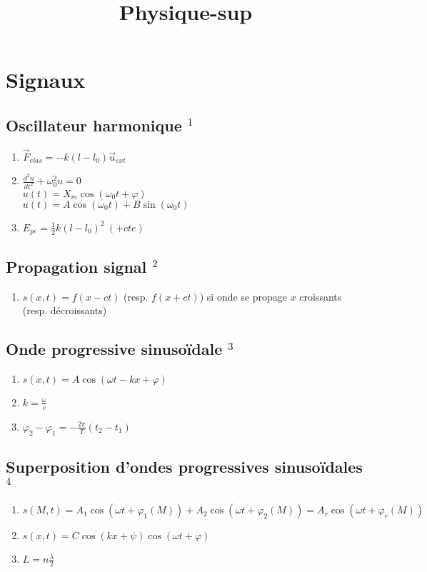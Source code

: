 \documentclass[fleqn]{article}
\title{Physique-sup}
\date{}
\theoremstyle{definition} \newtheorem*{defi}{D\'efinition}
\theoremstyle{definition} \newtheorem*{theo}{Th\'eor\`eme}
\theoremstyle{definition} \newtheorem*{coro}{Corollaire}
\theoremstyle{remark} \newtheorem*{rqs}{Remarques}
\theoremstyle{definition} \newtheorem*{prop}{Propri\'et\'e}
\begin{document}
\maketitle
\tableofcontents

\newpage
\section{Signaux}
\subsection{Oscillateur harmonique $^1$}
\begin{enumerate}
	\item $\vec{F}_{elas} = -k(l - l_0)\vec{u}_{ext}$
	\item $\frac{d^2u}{dt^2} + \omega_0^2 u = 0$ \\
		$u(t) = X_m \cos(\omega_0 t + \varphi)$\\
		$u(t) = A\cos(\omega_0 t) + B\sin(\omega_0 t)$
	\item  $E_{pe} = \frac{1}{2}k(l - l_0)^2\ (+cte)$
\end{enumerate}

\subsection{Propagation signal $^2$}
\begin{enumerate}
	\item $s(x,t) = f(x - ct)$ (resp. $f(x + ct)$) si onde se propage $x$ croissants (resp. d\'ecroissants)
\end{enumerate}

\subsection{Onde progressive sinuso\"idale $^3$}
\begin{enumerate}
	\item $s(x,t) = A\cos(\omega t - kx + \varphi)$
	\item $k =  \frac{\omega}{c}$
	\item $\varphi_2 - \varphi_1 = -\frac{2\pi}{T} (t_2 - t_1)$
\end{enumerate}

\subsection{Superposition d'ondes progressives sinuso\"idales $^4$}
\begin{enumerate}
	\item $s(M,t) = A_1\cos(\omega t + \varphi_1 (M)) + A_2\cos(\omega t + \varphi_2 (M)) = A_r\cos(\omega t + \varphi_r (M))$
	\item $s(x,t) = C\cos(kx + \psi)\cos(\omega t + \varphi)$
	\item $L = n \frac{\lambda}{2}$
\end{enumerate}
\end{document}
